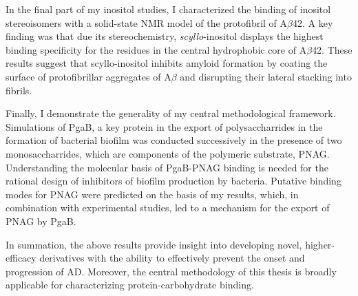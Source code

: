 In the final part of my inositol studies, I characterized the binding of inositol stereoisomers with a solid-state NMR model of the protofibril of A$\beta$42. A key finding was that due its stereochemistry, \textit{scyllo}-inositol displays the highest binding specificity for the residues in the central hydrophobic core of A$\beta$42. These results suggest that scyllo-inositol inhibits amyloid formation by coating the surface of protofibrillar aggregates of A$\beta$ and disrupting their lateral stacking into fibrils.

Finally, I demonstrate the generality of my central methodological framework. Simulations of PgaB, a key protein in the export of polysaccharrides in the formation of bacterial biofilm was conducted successively in the presence of two monosaccharrides, which are components of the polymeric substrate, PNAG.   Understanding the molecular basis of PgaB-PNAG binding is needed for the rational design of inhibitors of biofilm production by bacteria.   Putative binding modes for PNAG were predicted on the basis of my results, which, in combination with experimental studies, led to a mechanism for the export of PNAG by PgaB.

In summation, the above results provide insight into developing novel, higher-efficacy derivatives with the ability to effectively prevent the onset and progression of AD.  Moreover, the central methodology of this thesis is broadly applicable for characterizing protein-carbohydrate binding.





